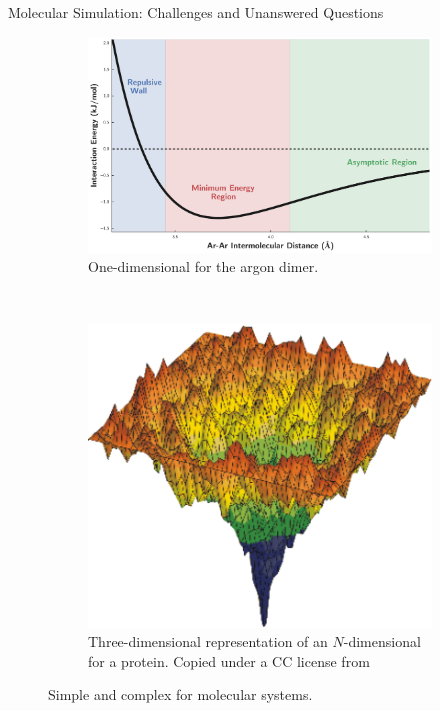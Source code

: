 \begin{section}{Molecular Simulation: Challenges and Unanswered Questions}
\begin{figure}
\centering
    \begin{subfigure}[t]{0.75\textwidth}
        \centering
        \includegraphics[width=1.0\textwidth]{workflow/generalized_pes.pdf}
        \caption{One-dimensional \pes for the argon dimer.}
    \end{subfigure}
    ~ 
    \begin{subfigure}[t]{0.75\textwidth}
        \centering
        \includegraphics[width=1.0\textwidth]{intro/protein_pes.pdf}
        \caption{Three-dimensional representation of an $N$-dimensional \pes
            for a protein. Copied under a CC license from \citet{Chaplin2017} }
    \end{subfigure}%
\caption{Simple and complex  for molecular systems.}
\label{fig:intro-pes}
\end{figure}


\end{section}
